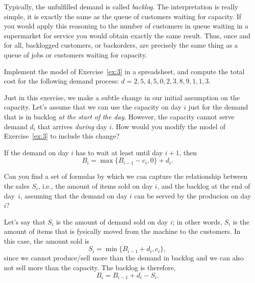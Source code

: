 Typically, the unfulfilled demand is called \emph{backlog}. The
interpretation is really simple, it is exactly the same as the queue
of customers waiting for capacity. If you would apply this reasoning
to the number of customers in queue waiting in a supermarket for
service you would obtain exactly the same result. Thus, once and for
all, backlogged customers, or backorders, are precisely the same thing
as a queue of jobs or customers waiting for capacity.

\begin{exercise}
  Implement the model of Exercise~\ref{ex:3} in a spreadsheet, and compute the total cost for the
  following demand process: $d = 2, 5, 4, 5, 0, 2, 3, 8, 9, 1, 1, 3$.
\begin{solution}
\end{solution}
\end{exercise}

\begin{exercise}
  Just in this exercise, we make a subtle change in our initial assumption on the capacity. 
  Let's assume that we can use the capacity on day $i$ just for the  
  demand that is in  backlog \emph{at the start of the day}. However, the capacity cannot serve demand $d_i$ that arrives \emph{during} day $i$.  How would you modify the model of Exercise~\ref{ex:3} to include this change?
  \begin{solution}
If the demand on day $i$ has to wait at least until day $i+1$, then
    \begin{equation*}
    B_i = \max\{B_{i-1} - c_i, 0\} + d_i.
    \end{equation*}

  \end{solution}
\end{exercise}
 


\begin{exercise}
  Can you find a set of formulas by which we can capture the relationship between the sales $S_i$, i.e., the amount of items sold on day $i$,  and the backlog at the end of day~$i$, assuming that the demand on day $i$ can be served by the producion on day $i$? 


  \begin{solution}
    Let's say that $S_i$ is the amount of demand sold on day $i$; in other words, $S_i$ is the amount of items that is fysically moved from the machine to the customers. In this case, the amount sold is 
    \begin{equation*}
      S_i = \min\{B_{i-1}+d_i, c_i\},
    \end{equation*}
    since we cannot produce/sell more than the demand in backlog and
    we can also not sell more than the capacity.  The backlog is therefore,
\begin{equation*}
  B_i = B_{i-1}+d_i - S_i.
\end{equation*}
  \end{solution}
\end{exercise}

